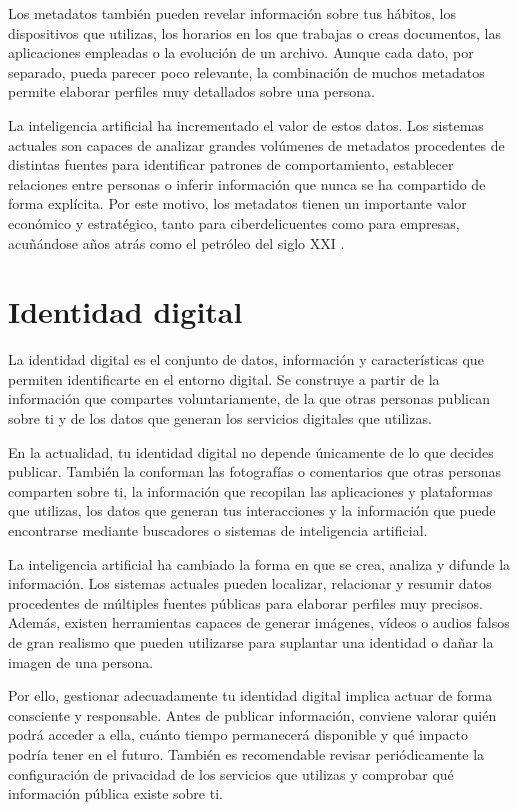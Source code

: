 \documentclass[
  spanish,
  a4paper,
  openany]{book}
\begin{document}
Los metadatos también pueden revelar información sobre tus hábitos, los dispositivos que utilizas, los horarios en los que trabajas o creas documentos, las aplicaciones empleadas o la evolución de un archivo. Aunque cada dato, por separado, pueda parecer poco relevante, la combinación de muchos metadatos permite elaborar perfiles muy detallados sobre una persona.

La inteligencia artificial ha incrementado el valor de estos datos. Los sistemas actuales son capaces de analizar grandes volúmenes de metadatos procedentes de distintas fuentes para identificar patrones de comportamiento, establecer relaciones entre personas o inferir información que nunca se ha compartido de forma explícita. Por este motivo, los metadatos tienen un importante valor económico y estratégico, tanto para ciberdelicuentes como para empresas, acuñándose años atrás como el petróleo del siglo XXI \citep{OSI-petroleo-S-XXI}.

\section{Identidad digital}\label{identidad-digital}

La identidad digital es el conjunto de datos, información y características que permiten identificarte en el entorno digital. Se construye a partir de la información que compartes voluntariamente, de la que otras personas publican sobre ti y de los datos que generan los servicios digitales que utilizas.

En la actualidad, tu identidad digital no depende únicamente de lo que decides publicar. También la conforman las fotografías o comentarios que otras personas comparten sobre ti, la información que recopilan las aplicaciones y plataformas que utilizas, los datos que generan tus interacciones y la información que puede encontrarse mediante buscadores o sistemas de inteligencia artificial.

La inteligencia artificial ha cambiado la forma en que se crea, analiza y difunde la información. Los sistemas actuales pueden localizar, relacionar y resumir datos procedentes de múltiples fuentes públicas para elaborar perfiles muy precisos. Además, existen herramientas capaces de generar imágenes, vídeos o audios falsos de gran realismo que pueden utilizarse para suplantar una identidad o dañar la imagen de una persona.

Por ello, gestionar adecuadamente tu identidad digital implica actuar de forma consciente y responsable. Antes de publicar información, conviene valorar quién podrá acceder a ella, cuánto tiempo permanecerá disponible y qué impacto podría tener en el futuro. También es recomendable revisar periódicamente la configuración de privacidad de los servicios que utilizas y comprobar qué información pública existe sobre ti.
\end{document}
